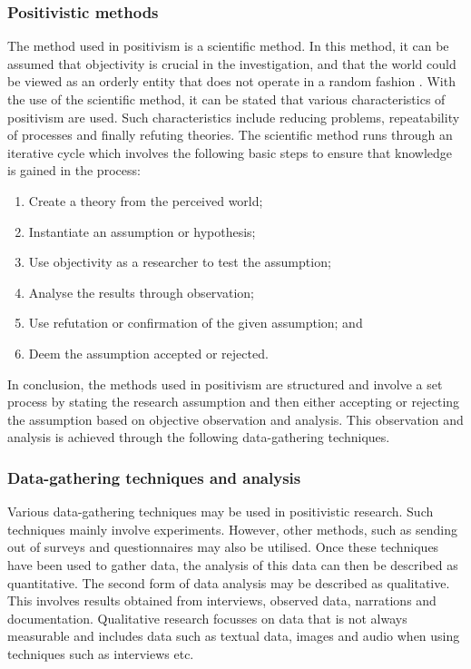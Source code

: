 \subsubsection{Positivistic methods}
The method used in positivism is a scientific method. In this method, it can be assumed that objectivity is crucial in the investigation, and that the world could be viewed as an orderly entity that does not operate in a random fashion \citep{OatesJ2006}. 
With the use of the scientific method, it can be stated that various characteristics of positivism are used. Such characteristics include reducing problems, repeatability of processes and finally refuting theories. 
The scientific method runs through an iterative cycle which involves the following basic steps to ensure that knowledge is gained in the process:
\begin{enumerate}
	\item Create a theory from the perceived world;
	\item Instantiate an assumption or hypothesis;
	\item Use objectivity as a researcher to test the assumption;
	\item Analyse the results through observation;
	\item Use refutation or confirmation of the given assumption; and
	\item Deem the assumption accepted or rejected.
\end{enumerate}

In conclusion, the methods used in positivism are structured and involve a set process by stating the research assumption and then either accepting or rejecting the assumption based on objective observation and analysis. This observation and analysis is achieved through the following data-gathering techniques.

\subsubsection{Data-gathering techniques and analysis}
Various data-gathering techniques may be used in positivistic research. Such techniques mainly involve experiments. However, other methods, such as sending out of surveys and questionnaires may also be utilised. Once these techniques have been used to gather data, the analysis of this data can then be described as quantitative. The second form of data analysis may be described as qualitative. This involves results obtained from interviews, observed data, narrations and documentation. Qualitative research focusses on data that is not always measurable and includes data such as textual data, images and audio when using techniques such as interviews etc. 

